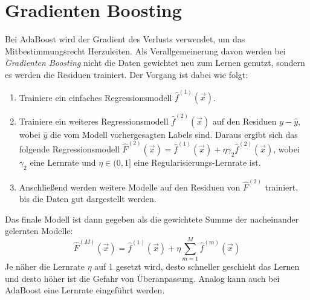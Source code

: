 	\section{Gradienten Boosting} %
		\label{sec:gradientBoosting}

		Bei AdaBoost wird der Gradient des Verlusts verwendet, um das Mitbestimmungsrecht Herzuleiten. Als Verallgemeinerung davon werden bei \emph{Gradienten Boosting} nicht die Daten gewichtet neu zum Lernen genutzt, sondern es werden die Residuen trainiert. Der Vorgang ist dabei wie folgt:
		\begin{enumerate}
			\item Trainiere ein einfaches Regressionsmodell \( \hat{f}^{(1)}(\vec{x}) \).
			\item Trainiere ein weiteres Regressionsmodell \( \hat{f}^{(2)}(\vec{x}) \) auf den Residuen \( y - \hat{y} \), wobei \(\hat{y}\) die vom Modell vorhergesagten Labels sind. Daraus ergibt sich das folgende Regressionsmodell \( \hat{F}^{(2)}(\vec{x}) = \hat{f}^{(1)}(\vec{x}) + \eta \gamma_2 \hat{f}^{(2)}(\vec{x}) \), wobei \(\gamma_2\) eine Lernrate und \(\eta \in (0, 1]\) eine Regularisierungs-Lernrate ist.
			\item Anschließend werden weitere Modelle auf den Residuen von \(\hat{F}^{(2)}\) trainiert, bis die Daten gut dargestellt werden.
		\end{enumerate}
		Das finale Modell ist dann gegeben als die gewichtete Summe der nacheinander gelernten Modelle:
		\begin{equation}
			\hat{F}^{(M)}(\vec{x}) = \hat{f}^{(1)}(\vec{x}) + \eta \sum_{m = 1}^{M} \hat{f}^{(m)}(\vec{x})
		\end{equation}
		Je näher die Lernrate \(\eta\) auf \num{1} gesetzt wird, desto schneller geschieht das Lernen und desto höher ist die Gefahr von Überanpassung. Analog kann auch bei AdaBoost eine Lernrate eingeführt werden.

